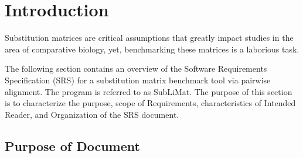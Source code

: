 \documentclass[12pt]{article}
\begin{document}





\section{Introduction}

Substitution matrices are critical assumptions that greatly impact studies
in the area of comparative biology, yet, benchmarking these matrices is a 
laborious task.

The following section contains an overview of the Software Requirements Specification (SRS)
for a substitution matrix benchmark tool via pairwise alignment. The program is referred to 
as SubLiMat. The purpose of this section is to characterize the purpose, scope of Requirements, 
characteristics of Intended Reader, and Organization of the SRS document.


\subsection{Purpose of Document}
\end{document}
